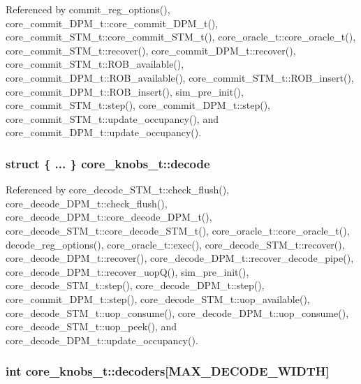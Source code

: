 Referenced by commit\_\-reg\_\-options(), core\_\-commit\_\-DPM\_\-t::core\_\-commit\_\-DPM\_\-t(), core\_\-commit\_\-STM\_\-t::core\_\-commit\_\-STM\_\-t(), core\_\-oracle\_\-t::core\_\-oracle\_\-t(), core\_\-commit\_\-STM\_\-t::recover(), core\_\-commit\_\-DPM\_\-t::recover(), core\_\-commit\_\-STM\_\-t::ROB\_\-available(), core\_\-commit\_\-DPM\_\-t::ROB\_\-available(), core\_\-commit\_\-STM\_\-t::ROB\_\-insert(), core\_\-commit\_\-DPM\_\-t::ROB\_\-insert(), sim\_\-pre\_\-init(), core\_\-commit\_\-STM\_\-t::step(), core\_\-commit\_\-DPM\_\-t::step(), core\_\-commit\_\-STM\_\-t::update\_\-occupancy(), and core\_\-commit\_\-DPM\_\-t::update\_\-occupancy().
\subsubsection[{decode}]{\setlength{\rightskip}{0pt plus 5cm}struct \{ ... \}   {\bf core\_\-knobs\_\-t::decode}}\label{structcore__knobs__t_6dc1fa40282035ef593c34664e66c2a1}




Referenced by core\_\-decode\_\-STM\_\-t::check\_\-flush(), core\_\-decode\_\-DPM\_\-t::check\_\-flush(), core\_\-decode\_\-DPM\_\-t::core\_\-decode\_\-DPM\_\-t(), core\_\-decode\_\-STM\_\-t::core\_\-decode\_\-STM\_\-t(), core\_\-oracle\_\-t::core\_\-oracle\_\-t(), decode\_\-reg\_\-options(), core\_\-oracle\_\-t::exec(), core\_\-decode\_\-STM\_\-t::recover(), core\_\-decode\_\-DPM\_\-t::recover(), core\_\-decode\_\-DPM\_\-t::recover\_\-decode\_\-pipe(), core\_\-decode\_\-DPM\_\-t::recover\_\-uopQ(), sim\_\-pre\_\-init(), core\_\-decode\_\-STM\_\-t::step(), core\_\-decode\_\-DPM\_\-t::step(), core\_\-commit\_\-DPM\_\-t::step(), core\_\-decode\_\-STM\_\-t::uop\_\-available(), core\_\-decode\_\-STM\_\-t::uop\_\-consume(), core\_\-decode\_\-DPM\_\-t::uop\_\-consume(), core\_\-decode\_\-STM\_\-t::uop\_\-peek(), and core\_\-decode\_\-DPM\_\-t::update\_\-occupancy().
\subsubsection[{decoders}]{\setlength{\rightskip}{0pt plus 5cm}int {\bf core\_\-knobs\_\-t::decoders}[MAX\_\-DECODE\_\-WIDTH]}\label{structcore__knobs__t_49f397a2ac5d7d53b172d565ee9de02b}




